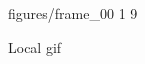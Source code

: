 \documentclass{beamer}
\begin{document}
\begin{frame}
  \begin{figure}
    \centering
    {figures/frame\_00}%
    {1}%
    {9}%
    \caption{Local gif}
    \label{fig:my_label}
  \end{figure}
\end{frame}
\end{document}
